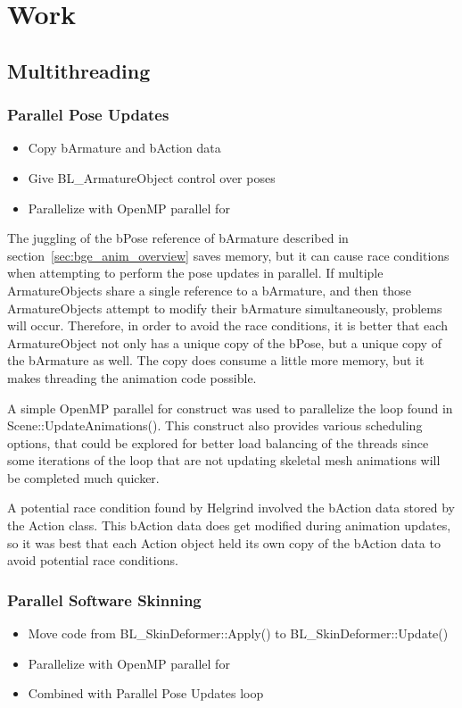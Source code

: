 \section{Work}
\subsection{Multithreading}
\subsubsection{Parallel Pose Updates}
\ifsummaries
\begin{itemize}
 \item Copy bArmature and bAction data
 \item Give BL\_ArmatureObject control over poses
 \item Parallelize with OpenMP parallel for
\end{itemize}
\fi

The juggling of the bPose reference of bArmature described in section~\ref{sec:bge_anim_overview} saves memory, but it can cause race conditions when attempting to perform the pose updates in parallel.
If multiple ArmatureObjects share a single reference to a bArmature, and then those ArmatureObjects attempt to modify their bArmature simultaneously, problems will occur.
Therefore, in order to avoid the race conditions, it is better that each ArmatureObject not only has a unique copy of the bPose, but a unique copy of the bArmature as well.
The copy does consume a little more memory, but it makes threading the animation code possible.

A simple OpenMP parallel for construct was used to parallelize the loop found in Scene::UpdateAnimations().
This construct also provides various scheduling options, that could be explored for better load balancing of the threads since some iterations of the loop that are not updating skeletal mesh animations will be completed much quicker.

A potential race condition found by Helgrind involved the bAction data stored by the Action class.
This bAction data does get modified during animation updates, so it was best that each Action object held its own copy of the bAction data to avoid potential race conditions.



\subsubsection{Parallel Software Skinning}
\label{sec:parallel_software_skinning}
\ifsummaries
\begin{itemize}
 \item Move code from BL\_SkinDeformer::Apply() to BL\_SkinDeformer::Update()
 \item Parallelize with OpenMP parallel for
 \item Combined with Parallel Pose Updates loop
\end{itemize}
\fi

